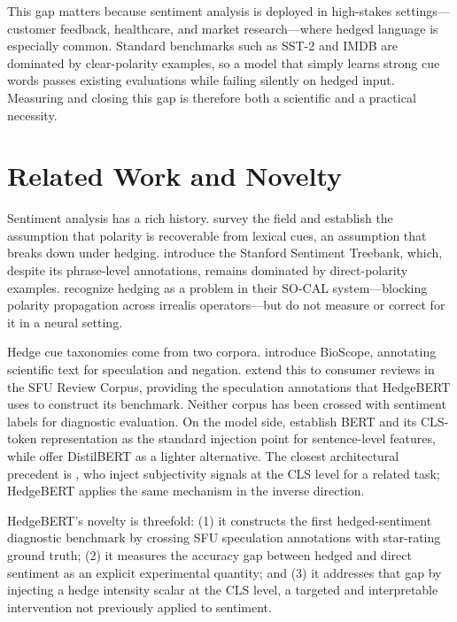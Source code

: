 \documentclass[11pt]{article}
\begin{document}
This gap matters because sentiment analysis is deployed in high-stakes
settings---customer feedback, healthcare, and market research---where hedged language
is especially common. Standard benchmarks such as SST-2 \cite{socher2013recursive}
and IMDB are dominated by clear-polarity examples, so a model that simply learns
strong cue words passes existing evaluations while failing silently on hedged input.
Measuring and closing this gap is therefore both a scientific and a practical
necessity.

\section{Related Work and Novelty}

Sentiment analysis has a rich history. \citet{pang2008opinion} survey the field and
establish the assumption that polarity is recoverable from lexical cues, an
assumption that breaks down under hedging. \citet{socher2013recursive} introduce the
Stanford Sentiment Treebank, which, despite its phrase-level annotations, remains
dominated by direct-polarity examples. \citet{taboada2011lexicon} recognize hedging
as a problem in their SO-CAL system---blocking polarity propagation across irrealis
operators---but do not measure or correct for it in a neural setting.

Hedge cue taxonomies come from two corpora. \citet{vincze2008bioscope} introduce
BioScope, annotating scientific text for speculation and negation.
\citet{konstantinova2012sfu} extend this to consumer reviews in the SFU Review
Corpus, providing the speculation annotations that HedgeBERT uses to construct its
benchmark. Neither corpus has been crossed with sentiment labels for diagnostic
evaluation. On the model side, \citet{devlin2019bert} establish BERT and its
CLS-token representation as the standard injection point for sentence-level features,
while \citet{sanh2019distilbert} offer DistilBERT as a lighter alternative. The
closest architectural precedent is \citet{fasulo2025checkthat}, who inject
subjectivity signals at the CLS level for a related task; HedgeBERT applies the same
mechanism in the inverse direction.

HedgeBERT's novelty is threefold: (1) it constructs the first hedged-sentiment
diagnostic benchmark by crossing SFU speculation annotations with star-rating ground
truth; (2) it measures the accuracy gap between hedged and direct sentiment as an
explicit experimental quantity; and (3) it addresses that gap by injecting a hedge
intensity scalar at the CLS level, a targeted and interpretable intervention not
previously applied to sentiment.
\end{document}

